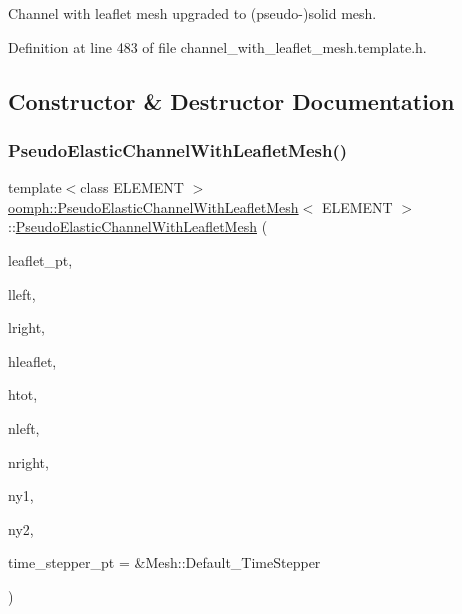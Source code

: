 Channel with leaflet mesh upgraded to (pseudo-\/)solid mesh. 

Definition at line 483 of file channel\+\_\+with\+\_\+leaflet\+\_\+mesh.\+template.\+h.



\subsection{Constructor \& Destructor Documentation}
\mbox{\label{classoomph_1_1PseudoElasticChannelWithLeafletMesh_a240a700ff3e934607b29d4ad14c6d70e}} 
\subsubsection{\texorpdfstring{Pseudo\+Elastic\+Channel\+With\+Leaflet\+Mesh()}{PseudoElasticChannelWithLeafletMesh()}}
{\footnotesize\ttfamily template$<$class E\+L\+E\+M\+E\+NT $>$ \\
\hyperlink{classoomph_1_1PseudoElasticChannelWithLeafletMesh}{oomph\+::\+Pseudo\+Elastic\+Channel\+With\+Leaflet\+Mesh}$<$ E\+L\+E\+M\+E\+NT $>$\+::\hyperlink{classoomph_1_1PseudoElasticChannelWithLeafletMesh}{Pseudo\+Elastic\+Channel\+With\+Leaflet\+Mesh} (\begin{DoxyParamCaption}\item[{Geom\+Object $\ast$}]{leaflet\+\_\+pt,  }\item[{const double \&}]{lleft,  }\item[{const double \&}]{lright,  }\item[{const double \&}]{hleaflet,  }\item[{const double \&}]{htot,  }\item[{const unsigned \&}]{nleft,  }\item[{const unsigned \&}]{nright,  }\item[{const unsigned \&}]{ny1,  }\item[{const unsigned \&}]{ny2,  }\item[{Time\+Stepper $\ast$}]{time\+\_\+stepper\+\_\+pt = {\ttfamily \&Mesh\+:\+:Default\+\_\+TimeStepper} }\end{DoxyParamCaption})\hspace{0.3cm}{\ttfamily [inline]}}



